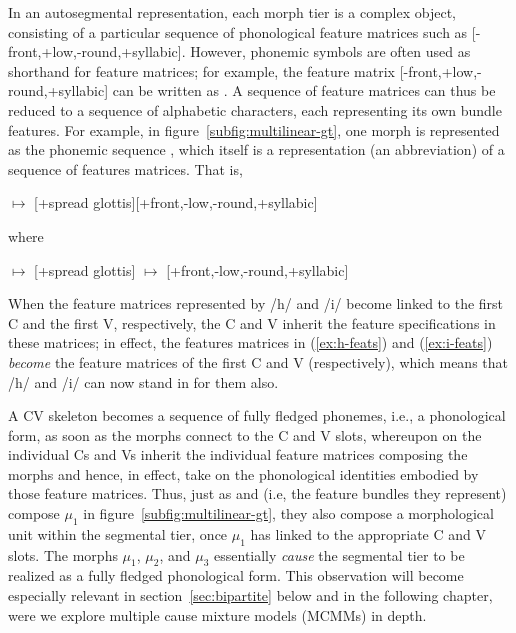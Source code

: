 In an autosegmental representation, each morph tier is a complex object, consisting of a particular sequence of phonological feature matrices such as [-front,+low,-round,+syllabic]. However, phonemic symbols are often used as shorthand for
feature matrices; for example, the feature matrix [-front,+low,-round,+syllabic] can
be written as . A sequence of feature matrices can thus be 
reduced to a sequence of alphabetic characters, each representing its own 
bundle features. For example, in figure~\ref{subfig:multilinear-gt}, 
one morph is represented as the phonemic sequence , which itself is a representation (an abbreviation)
of a sequence of features matrices. That is, %
\begin{exe}
\ex {} \quad $\mapsto$ \quad \textipa{/}[+spread glottis][+front,-low,-round,+syllabic]\textipa{/}
\end{exe}
where 
\begin{exe} 
\ex  \label{ex:h-feats}  \quad $\mapsto$ \quad \textipa{/}[+spread glottis]\textipa{/}
\ex  \label{ex:i-feats}  \quad $\mapsto$ \quad \textipa{/}[+front,-low,-round,+syllabic]\textipa{/}
\end{exe}
When the feature matrices represented by /h/ and /i/ become linked to the first 
C and the first V, respectively, the C and V inherit the feature specifications in these matrices; in effect,
the features matrices in (\ref{ex:h-feats}) and (\ref{ex:i-feats}) \emph{become} the
feature matrices of the first C and V (respectively),
which means that /h/ and /i/ can now stand in for them also. %

A CV skeleton becomes a sequence of fully fledged phonemes, i.e., a phonological
form, as soon as the morphs connect to the C and V slots, whereupon on the individual Cs and Vs inherit the individual feature matrices composing the morphs and hence, in effect, take on the phonological identities
embodied by those feature matrices.  
Thus, just as  and  (i.e, the feature bundles they represent) compose 
$\mu_1$ in figure~\ref{subfig:multilinear-gt}, they also compose a morphological 
unit within the segmental tier, once $\mu_1$ has linked to the appropriate C and V slots. The morphs $\mu_1$, $\mu_2$, and $\mu_3$ 
essentially \emph{cause} the segmental tier to be realized as a fully fledged 
phonological form. This observation will become especially relevant in 
section~\ref{sec:bipartite} below and in the following chapter, were we explore multiple cause mixture models (MCMMs) in depth.

